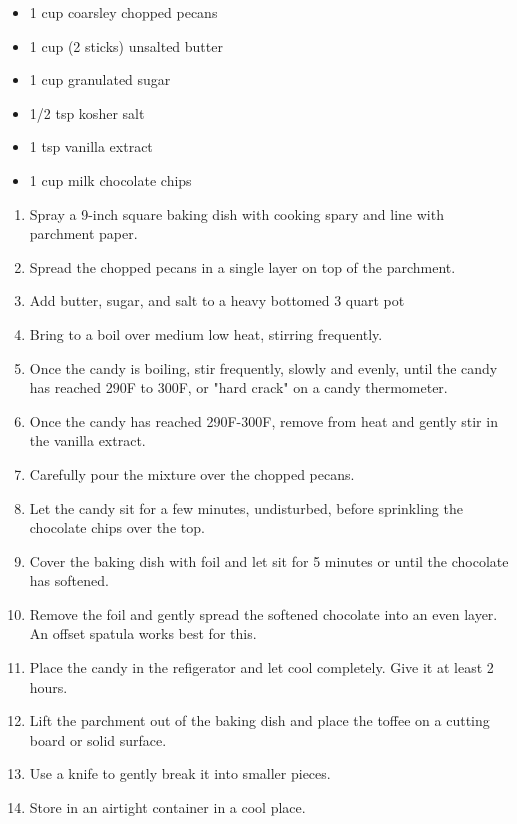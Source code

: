 \documentclass{article}
\begin{document}
\begin{framed}
\begin{itemize}
    \item 1 cup coarsley chopped pecans
    \item 1 cup (2 sticks) unsalted butter
    \item 1 cup granulated sugar
    \item 1/2 tsp kosher salt
    \item 1 tsp vanilla extract
    \item 1 cup milk chocolate chips
\end{itemize}
\end{framed}

\begin{enumerate}
    \item 
        Spray a 9-inch square baking dish with cooking spary and line with parchment paper.
    \item 
        Spread the chopped pecans in a single layer on top of the parchment.
    \item 
        Add butter, sugar, and salt to a heavy bottomed 3 quart pot
    \item 
        Bring to a boil over medium low heat, stirring frequently.
    \item 
        Once the candy is boiling, stir frequently, slowly and evenly, until the candy has reached 290F to 300F, or "hard crack" on a candy thermometer.
    \item
        Once the candy has reached 290F-300F, remove from heat and gently stir in the vanilla extract.
    \item 
        Carefully pour the mixture over the chopped pecans.
    \item 
        Let the candy sit for a few minutes, undisturbed, before sprinkling the chocolate chips over the top.
    \item 
        Cover the baking dish with foil and let sit for 5 minutes or until the chocolate has softened.
    \item 
        Remove the foil and gently spread the softened chocolate into an even layer. An offset spatula works best for this.
    \item
        Place the candy in the refigerator and let cool completely. Give it at least 2 hours.
    \item 
        Lift the parchment out of the baking dish and place the toffee on a cutting board or solid surface.
    \item 
        Use a knife to gently break it into smaller pieces.
    \item 
        Store in an airtight container in a cool place.
\end{enumerate}
\newpage
\end{document}
